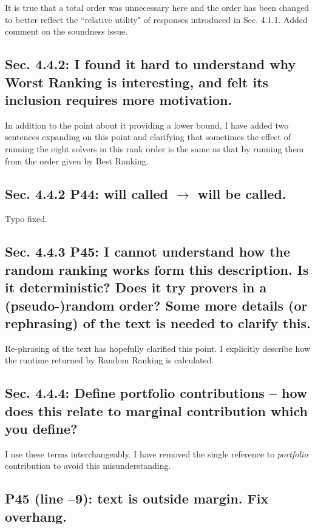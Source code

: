\documentclass[]{article}
\begin{document}
It is true that a total order was unnecessary here and the order has been changed to better reflect the ``relative utility" of responses introduced in Sec. 4.1.1. 
Added comment on the soundness issue.

\subsection{Sec. 4.4.2: I found it hard to understand why Worst Ranking is interesting, and felt its inclusion requires more motivation.}

In addition to the point about it providing a lower bound, I have added two sentences expanding on this point and clarifying that sometimes the effect of running the eight solvers in this rank order is the same as that by running them from the order given by \textsf{Best Ranking}.

\subsection{Sec. 4.4.2 P44: will called $\rightarrow$ will be called.}

Typo fixed.

\subsection{Sec. 4.4.3 P45: I cannot understand how the random ranking works form this description. Is it deterministic? Does it try provers in a (pseudo-)random order? Some more details (or rephrasing) of the text is needed to clarify this.}

Re-phrasing of the text has hopefully clarified this point.
I explicitly describe how the runtime returned by \textsf{Random Ranking} is calculated. 

\subsection{Sec. 4.4.4: Define portfolio contributions – how does this relate to marginal contribution which you define?}

I use these terms interchangeably. I have removed the single reference to \textit{portfolio} contribution to avoid this misunderstanding. 

\subsection{P45 (line –9): text is outside margin. Fix overhang.}
\end{document}
